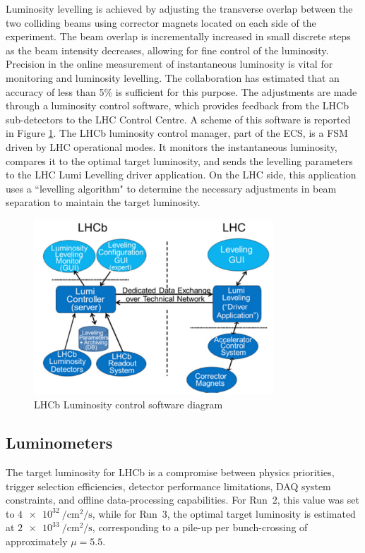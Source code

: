 Luminosity levelling is achieved by adjusting the transverse overlap between the two colliding beams using corrector magnets located on each side of the experiment. The beam overlap is incrementally increased in small discrete steps as the beam intensity decreases, allowing for fine control of the luminosity. Precision in the online measurement of instantaneous luminosity is vital for monitoring and luminosity levelling. The collaboration has estimated that an accuracy of less than 5\% is sufficient for this purpose. 
 The adjustments are made through a luminosity control software, which provides feedback from the LHCb sub-detectors to the LHC Control Centre. A scheme of this software is reported in Figure \ref{fig:lumi-control}.
The LHCb luminosity control manager, part of the ECS, is a FSM driven by LHC operational modes. It monitors the instantaneous luminosity, compares it to the optimal target luminosity, and sends the levelling parameters to the LHC Lumi Levelling driver application. On the LHC side, this application uses a ``levelling algorithm" to determine the necessary adjustments in beam separation to maintain the target luminosity.

\begin{figure}
    \centering
    \includegraphics[width=0.8\textwidth]{figures/lumi_control.png}
    \caption{LHCb Luminosity control software diagram}
    \label{fig:lumi-control}
\end{figure}

\subsection{Luminometers}\label{sec:luminometers}
The target luminosity for LHCb is a compromise between physics priorities, trigger selection efficiencies, detector performance limitations, DAQ system constraints, and offline data-processing capabilities. For Run~2, this value was set to $\SI{4e32}{\per\centi\meter\squared\per\second}$, while for Run~3, the optimal target luminosity is estimated at $\SI{2e33}{\per\centi\meter\squared\per\second}$, corresponding to a pile-up per bunch-crossing of approximately $\mu = 5.5$.

